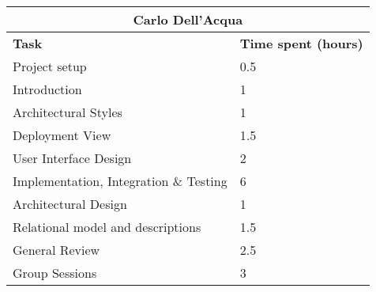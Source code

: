 \begin{table}[H]
  \centering
  \begin{tabular}{l|l}
    \multicolumn{2}{c}{\textbf{Carlo Dell'Acqua}} \\
    \hline
    \textbf{Task} & \textbf{Time spent (hours)}\\
    \hline
    Project setup & 0.5 \\
    Introduction & 1 \\
    Architectural Styles & 1 \\
    Deployment View & 1.5 \\
    User Interface Design & 2 \\
    Implementation, Integration \& Testing & 6 \\
    Architectural Design & 1 \\
    Relational model and descriptions & 1.5 \\
    General Review & 2.5 \\
    Group Sessions & 3 \\
  \end{tabular}
\end{table}